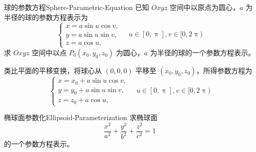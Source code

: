\begin{problem}{球的参数方程}{Sphere-Parametric-Equation}
    已知 $Oxyz$ 空间中以原点为圆心，$a$ 为半径的球的参数方程表示为
    \begin{equation}
        \begin{cases}
            x = a \sin u \cos v, \\
            y = a \sin u \sin v, \\
            z = a \cos u,
        \end{cases} \quad u \in [0, \uppi], v \in [0, 2\uppi)
    \end{equation}
    求 $Oxyz$ 空间中以点 $P_0(x_0, y_0, z_0)$ 为圆心，$a$ 为半径的球的一个参数方程表示。
\end{problem}

\begin{solution}
    类比平面的平移变换，将球心从 $(0, 0, 0)$ 平移至 $(x_0, y_0, z_0)$，所得参数方程为
    \begin{equation}
        \boxed{
        \begin{cases}
            x = x_0 + a \sin u \cos v, \\
            y = y_0 + a \sin u \sin v, \\
            z = z_0 + a \cos u,
        \end{cases} \quad u \in [0, \uppi], v \in [0, 2\uppi)
        }
    \end{equation}
\end{solution}


\begin{problem}{椭球面参数化}{Ellipsoid-Parameterization}
    求椭球面
    \begin{equation}
        \frac{x^2}{a^2} + \frac{y^2}{b^2} + \frac{z^2}{c^2} = 1
    \end{equation}
    的一个参数方程表示。
\end{problem}

